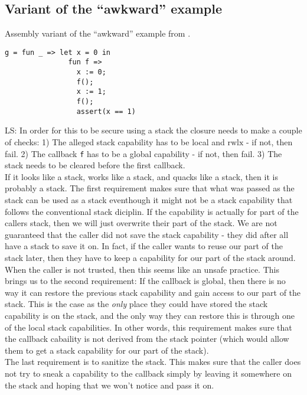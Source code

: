 \documentclass[a4paper]{article}
\newcommand\lau[1]{{\color{purple} \sf \footnotesize {LS: #1}}\\}
\newcommand{\plainperm}[1]{\mathrm{#1}}
\newcommand{\rwlx}{\plainperm{rwlx}}
\begin{document}
\subsection{Variant of the ``awkward'' example}
Assembly variant of the ``awkward'' example from \citep[p.~11]{Dreyer:2010:IHS:1863543.1863566}. 
\begin{verbatim}
g = fun _ => let x = 0 in
               fun f =>
                 x := 0;
                 f();
                 x := 1;
                 f();
                 assert(x == 1)
\end{verbatim}

\lau{In order for this to be secure using a stack the closure needs to make a couple of checks: 1) The alleged stack capability has to be local and $\rwlx$ - if not, then fail. 2) The callback \texttt{f} has to be a global capability - if not, then fail. 3) The stack needs to be cleared before the first callback. \\If it looks like a stack, works like a stack, and quacks like a stack, then it is probably a stack. The first requirement makes sure that what was passed as the stack can be used as a stack eventhough it might not be a stack capability that follows the conventional stack diciplin. If the capability is actually for part of the callers stack, then we will just overwrite their part of the stack. We are not guaranteed that the caller did not save the stack capability - they did after all have a stack to save it on. In fact, if the caller wants to reuse our part of the stack later, then they have to keep a capability for our part of the stack around. When the caller is not trusted, then this seems like an unsafe practice. This brings us to the second requirement: If the callback is global, then there is no way it can restore the previous stack capability and gain access to our part of the stack. This is the case as the \emph{only} place they could have stored the stack capability is on the stack, and the only way they can restore this is through one of the local stack capabilities. In other words, this requirement makes sure that the callback cabaility is not derived from the stack pointer (which would allow them to get a stack capability for our part of the stack).\\ The last requirement is to sanitize the stack. This makes sure that the caller does not try to sneak a capability to the callback simply by leaving it somewhere on the stack and hoping that we won't notice and pass it on. }
\end{document}
